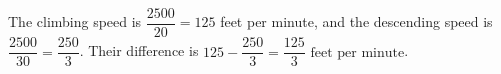 The climbing speed is $\dfrac{2500}{20}=125$ feet per minute, and the descending speed is $\dfrac{2500}{30}=\dfrac{250}{3}$. Their difference is $125-\dfrac{250}{3}=\boxed{\dfrac{125}{3}\text{ feet per minute}}$.

